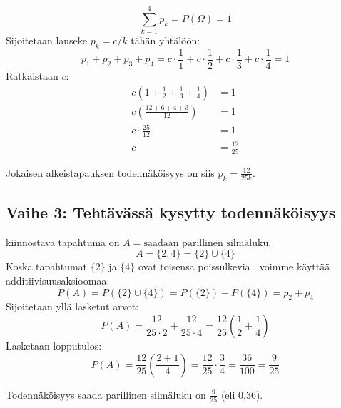 \documentclass[12pt,a4paper]{article}
\begin{document}
\[
\sum_{k=1}^{4} p_k = P(\Omega) = 1
\]
Sijoitetaan lauseke $p_k = c/k$ tähän yhtälöön:
\[
p_1 + p_2 + p_3 + p_4 = c \cdot \frac{1}{1} + c \cdot \frac{1}{2} + c \cdot \frac{1}{3} + c \cdot \frac{1}{4} = 1
\]
Ratkaistaan $c$:
\begin{align*}
    c \left( 1 + \frac{1}{2} + \frac{1}{3} + \frac{1}{4} \right) &= 1 \\
    c \left( \frac{12+6+4+3}{12} \right) &= 1 \\
    c \cdot \frac{25}{12} &= 1 \\
    c &= \frac{12}{25}
\end{align*}

Jokaisen alkeistapauksen todennäköisyys on siis $p_k = \frac{12}{25k}$.

\pagebreak
\subsection*{Vaihe 3: Tehtävässä kysytty todennäköisyys}
kiinnostava tapahtuma on $A = \text{saadaan parillinen silmäluku}$.
\[
A = \{2, 4\} = \{2\} \cup \{4\}
\]
Koska tapahtumat $\{2\}$ ja $\{4\}$ ovat toisensa poissulkevia ,
voimme käyttää additiivisuusaksioomaa:
\[
P(A) = P(\{2\} \cup \{4\}) = P(\{2\}) + P(\{4\}) = p_2 + p_4
\]
Sijoitetaan yllä lasketut arvot:
\[
P(A) = \frac{12}{25 \cdot 2} + \frac{12}{25 \cdot 4} = \frac{12}{25} \left( \frac{1}{2} + \frac{1}{4} \right)
\]
Lasketaan lopputulos:
\[
P(A) = \frac{12}{25} \left( \frac{2+1}{4} \right) = \frac{12}{25} \cdot \frac{3}{4} = \frac{36}{100} = \frac{9}{25}
\]

Todennäköisyys saada parillinen silmäluku on $\displaystyle \frac{9}{25}$ (eli 0,36).
\end{document}
